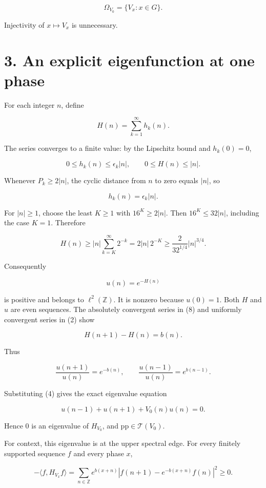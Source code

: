 \documentclass[11pt,a4paper]{article}
\begin{document}
\[
\Omega_{V_0}=\{V_x:x\in G\}.
\tag{7}
\]

Injectivity of \(x\mapsto V_x\) is unnecessary.

\hypertarget{1018-an-explicit-eigenfunction-at-one-phase}{%
\section{3. An explicit eigenfunction at one
phase}\label{1018-an-explicit-eigenfunction-at-one-phase}}

For each integer \(n\), define

\[
H(n)=\sum_{k=1}^\infty h_k(n).
\tag{8}
\]

The series converges to a finite value: by the Lipschitz bound and \(h_k(0)=0\),

\[
0\leq h_k(n)\leq\epsilon_k|n|,
\qquad 0\leq H(n)\leq|n|.
\tag{9}
\]

Whenever \(P_k\geq2|n|\), the cyclic distance from \(n\) to zero equals
\(|n|\), so

\[
h_k(n)=\epsilon_k|n|.
\tag{10}
\]

For \(|n|\geq1\), choose the least \(K\geq1\) with \(16^K\geq2|n|\).
Then \(16^K\leq32|n|\), including the case \(K=1\). Therefore

\[
H(n)\geq |n|\sum_{k=K}^\infty2^{-k}
=2|n|\,2^{-K}
\geq \frac{2}{32^{1/4}}|n|^{3/4}.
\tag{11}
\]

Consequently

\[
u(n)=e^{-H(n)}
\tag{12}
\]

is positive and belongs to \(\ell^2(\mathbb Z)\). It is nonzero because
\(u(0)=1\). Both \(H\) and \(u\) are even sequences. The absolutely
convergent series in (8) and uniformly convergent series in (2) show

\[
H(n+1)-H(n)=b(n).
\tag{13}
\]

Thus

\[
\frac{u(n+1)}{u(n)}=e^{-b(n)},\qquad
\frac{u(n-1)}{u(n)}=e^{b(n-1)}.
\]

Substituting (4) gives the exact eigenvalue equation

\[
u(n-1)+u(n+1)+V_0(n)u(n)=0.
\tag{14}
\]

Hence \(0\) is an eigenvalue of \(H_{V_0}\), and
\(\mathrm{pp}\in\mathcal T(V_0)\).

For context, this eigenvalue is at the upper spectral edge. For every
finitely supported sequence \(f\) and every phase \(x\),

\[
-\langle f,H_{V_x}f\rangle
=\sum_{n\in\mathbb Z}e^{b(x+n)}
\left|f(n+1)-e^{-b(x+n)}f(n)\right|^2\geq0.
\]
\end{document}
